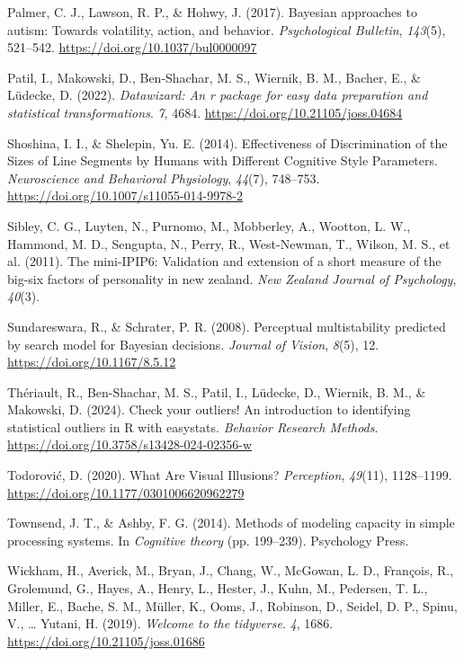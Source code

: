 \documentclass[
  man,
  floatsintext,
  longtable,
  nolmodern,
  notxfonts,
  notimes,
  colorlinks=true,linkcolor=blue,citecolor=blue,urlcolor=blue]{apa7}
\newlength{\cslhangindent}
\newenvironment{CSLReferences}[2] %
 {\begin{list}{}{%
  \setlength{\itemindent}{0pt}
  \setlength{\leftmargin}{0pt}
  \setlength{\parsep}{0pt}
  \ifodd #1
   \setlength{\leftmargin}{\cslhangindent}
   \setlength{\itemindent}{-1\cslhangindent}
  \fi
  \setlength{\itemsep}{#2\baselineskip}}}
 {\end{list}}
\begin{document}
\begin{CSLReferences}{1}{0}
Palmer, C. J., Lawson, R. P., \& Hohwy, J. (2017). Bayesian approaches
to autism: Towards volatility, action, and behavior. \emph{Psychological
Bulletin}, \emph{143}(5), 521--542.
\url{https://doi.org/10.1037/bul0000097}

Patil, I., Makowski, D., Ben-Shachar, M. S., Wiernik, B. M., Bacher, E.,
\& Lüdecke, D. (2022).
\emph{{\textbraceleft}Datawizard{\textbraceright}: An
{\textbraceleft}r{\textbraceright} package for easy data preparation and
statistical transformations}. \emph{7}, 4684.
\url{https://doi.org/10.21105/joss.04684}

Shoshina, I. I., \& Shelepin, Yu. E. (2014). Effectiveness of
Discrimination of the Sizes of Line Segments by Humans with Different
Cognitive Style Parameters. \emph{Neuroscience and Behavioral
Physiology}, \emph{44}(7), 748--753.
\url{https://doi.org/10.1007/s11055-014-9978-2}

Sibley, C. G., Luyten, N., Purnomo, M., Mobberley, A., Wootton, L. W.,
Hammond, M. D., Sengupta, N., Perry, R., West-Newman, T., Wilson, M. S.,
et al. (2011). The mini-IPIP6: Validation and extension of a short
measure of the big-six factors of personality in new zealand. \emph{New
Zealand Journal of Psychology}, \emph{40}(3).

Sundareswara, R., \& Schrater, P. R. (2008). Perceptual multistability
predicted by search model for Bayesian decisions. \emph{Journal of
Vision}, \emph{8}(5), 12. \url{https://doi.org/10.1167/8.5.12}

Thériault, R., Ben-Shachar, M. S., Patil, I., Lüdecke, D., Wiernik, B.
M., \& Makowski, D. (2024). Check your outliers﻿! An introduction to
identifying statistical outliers in R with easystats. \emph{Behavior
Research Methods}. \url{https://doi.org/10.3758/s13428-024-02356-w}

Todorović, D. (2020). What Are Visual Illusions? \emph{Perception},
\emph{49}(11), 1128--1199.
\url{https://doi.org/10.1177/0301006620962279}

Townsend, J. T., \& Ashby, F. G. (2014). Methods of modeling capacity in
simple processing systems. In \emph{Cognitive theory} (pp. 199--239).
Psychology Press.

Wickham, H., Averick, M., Bryan, J., Chang, W., McGowan, L. D.,
François, R., Grolemund, G., Hayes, A., Henry, L., Hester, J., Kuhn, M.,
Pedersen, T. L., Miller, E., Bache, S. M., Müller, K., Ooms, J.,
Robinson, D., Seidel, D. P., Spinu, V., \ldots{} Yutani, H. (2019).
\emph{Welcome to the {\textbraceleft}tidyverse{\textbraceright}}.
\emph{4}, 1686. \url{https://doi.org/10.21105/joss.01686}

\end{CSLReferences}
\end{document}
